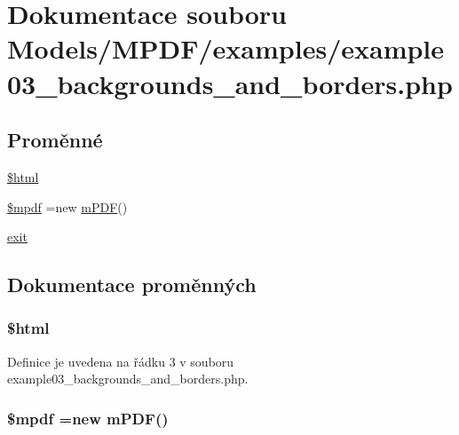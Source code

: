 \hypertarget{example03__backgrounds__and__borders_8php}{\section{Dokumentace souboru Models/\-M\-P\-D\-F/examples/example03\-\_\-backgrounds\-\_\-and\-\_\-borders.php}
\label{example03__backgrounds__and__borders_8php}
}
\subsection*{Proměnné}
\begin{DoxyCompactItemize}
\item 
\hyperlink{example03__backgrounds__and__borders_8php_a6f96e7fc92441776c9d1cd3386663b40}{\$html}
\item 
\hyperlink{example03__backgrounds__and__borders_8php_ad028f81910d6cbab9b184d2214b3a8f8}{\$mpdf} =new \hyperlink{classm_p_d_f}{m\-P\-D\-F}()
\item 
\hyperlink{example03__backgrounds__and__borders_8php_a6733eb5f605d09eaede9845835d71c4e}{exit}
\end{DoxyCompactItemize}


\subsection{Dokumentace proměnných}
\hypertarget{example03__backgrounds__and__borders_8php_a6f96e7fc92441776c9d1cd3386663b40}{
\subsubsection[{\$html}]{\setlength{\rightskip}{0pt plus 5cm}\$html}}\label{example03__backgrounds__and__borders_8php_a6f96e7fc92441776c9d1cd3386663b40}


Definice je uvedena na řádku 3 v souboru example03\-\_\-backgrounds\-\_\-and\-\_\-borders.\-php.

\hypertarget{example03__backgrounds__and__borders_8php_ad028f81910d6cbab9b184d2214b3a8f8}{
\subsubsection[{\$mpdf}]{\setlength{\rightskip}{0pt plus 5cm}\$mpdf =new {\bf m\-P\-D\-F}()}}\label{example03__backgrounds__and__borders_8php_ad028f81910d6cbab9b184d2214b3a8f8}


